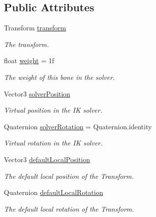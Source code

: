 \subsection*{Public Attributes}
\begin{DoxyCompactItemize}
\item 
Transform \mbox{\hyperlink{class_root_motion_1_1_final_i_k_1_1_i_k_solver_1_1_point_a438b0ff2494f43dfe97c2a1578b1ee06}{transform}}
\begin{DoxyCompactList}\small\item\em The transform. \end{DoxyCompactList}\item 
float \mbox{\hyperlink{class_root_motion_1_1_final_i_k_1_1_i_k_solver_1_1_point_a33184a0e0c8de5a15a1b0fc060f4e4fb}{weight}} = 1f
\begin{DoxyCompactList}\small\item\em The weight of this bone in the solver. \end{DoxyCompactList}\item 
Vector3 \mbox{\hyperlink{class_root_motion_1_1_final_i_k_1_1_i_k_solver_1_1_point_add5d89b8cfbc407f13d0de7eccaa3ed2}{solver\+Position}}
\begin{DoxyCompactList}\small\item\em Virtual position in the IK solver. \end{DoxyCompactList}\item 
Quaternion \mbox{\hyperlink{class_root_motion_1_1_final_i_k_1_1_i_k_solver_1_1_point_afe7e6e700d408b18d222b418db00201f}{solver\+Rotation}} = Quaternion.\+identity
\begin{DoxyCompactList}\small\item\em Virtual rotation in the IK solver. \end{DoxyCompactList}\item 
Vector3 \mbox{\hyperlink{class_root_motion_1_1_final_i_k_1_1_i_k_solver_1_1_point_ac2b8b3568242a0f7522520742ba00bdf}{default\+Local\+Position}}
\begin{DoxyCompactList}\small\item\em The default local position of the Transform. \end{DoxyCompactList}\item 
Quaternion \mbox{\hyperlink{class_root_motion_1_1_final_i_k_1_1_i_k_solver_1_1_point_aa55fe324bf0b1332bdba9778eddfd94f}{default\+Local\+Rotation}}
\begin{DoxyCompactList}\small\item\em The default local rotation of the Transform. \end{DoxyCompactList}\end{DoxyCompactItemize}


